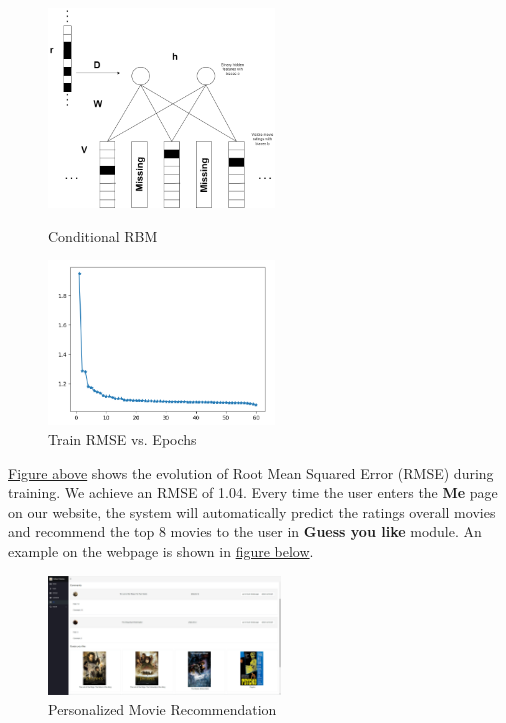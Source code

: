 \begin{CJK*}{UTF8}{gbsn}
\begin{figure}[htbp]
\centering
\label{RBM}
\begin{minipage}[t]{0.45\textwidth}
\centering
\includegraphics[width=6cm]{conditionalRBM.png}
\caption{Conditional RBM}
\label{rbm}
\end{minipage}
\begin{minipage}[t]{0.45\textwidth}
\centering
\includegraphics[width=6cm]{RBMResult.png}
\caption{Train RMSE vs. Epochs}
\end{minipage}
\end{figure}

\hyperref[RBM]{Figure above} shows the evolution of Root Mean Squared Error (RMSE) during training. We achieve an RMSE of 1.04. Every time the user enters the \textbf{Me} page on our website, the system will automatically predict the ratings overall movies and recommend the top 8 movies to the user in \textbf{Guess you like} module. An example on the webpage is shown in \hyperref[recommend]{figure below}.

\begin{figure}[h]
    \centering
    \label{recommend}
    \includegraphics[width = 0.55\textwidth]{recommendation.png}
    \caption{Personalized Movie Recommendation}
\end{figure}


\end{CJK*}
